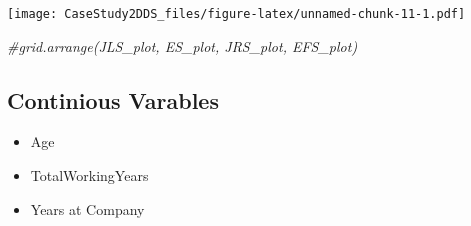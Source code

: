\documentclass[
]{article}
\newenvironment{Shaded}{\begin{snugshade}}{\end{snugshade}}
\newcommand{\CommentTok}[1]{\textcolor[rgb]{0.56,0.35,0.01}{\textit{#1}}}
\providecommand{\tightlist}{%
  \setlength{\itemsep}{0pt}\setlength{\parskip}{0pt}}
\begin{document}
\texttt{[image: CaseStudy2DDS\_files/figure-latex/unnamed-chunk-11-1.pdf]}

\begin{Shaded}
\begin{Highlighting}[]
\CommentTok{#grid.arrange(JLS_plot, ES_plot, JRS_plot, EFS_plot)}
\end{Highlighting}
\end{Shaded}

\hypertarget{continious-varables}{%
\subsection{Continious Varables}\label{continious-varables}}

\begin{itemize}
\tightlist
\item
  Age\\
\item
  TotalWorkingYears\\
\item
  Years at Company
\end{itemize}
\end{document}
